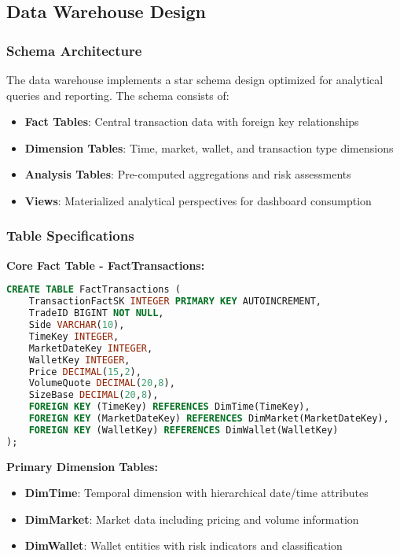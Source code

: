 \documentclass[12pt,a4paper]{article}
\begin{document}
\subsection{Data Warehouse Design}

\subsubsection{Schema Architecture}
The data warehouse implements a star schema design optimized for analytical queries and reporting. The schema consists of:

\begin{itemize}
    \item \textbf{Fact Tables}: Central transaction data with foreign key relationships
    \item \textbf{Dimension Tables}: Time, market, wallet, and transaction type dimensions
    \item \textbf{Analysis Tables}: Pre-computed aggregations and risk assessments
    \item \textbf{Views}: Materialized analytical perspectives for dashboard consumption
\end{itemize}

\subsubsection{Table Specifications}

\textbf{Core Fact Table - FactTransactions:}
\begin{lstlisting}[language=SQL]
CREATE TABLE FactTransactions (
    TransactionFactSK INTEGER PRIMARY KEY AUTOINCREMENT,
    TradeID BIGINT NOT NULL,
    Side VARCHAR(10),
    TimeKey INTEGER,
    MarketDateKey INTEGER,
    WalletKey INTEGER,
    Price DECIMAL(15,2),
    VolumeQuote DECIMAL(20,8),
    SizeBase DECIMAL(20,8),
    FOREIGN KEY (TimeKey) REFERENCES DimTime(TimeKey),
    FOREIGN KEY (MarketDateKey) REFERENCES DimMarket(MarketDateKey),
    FOREIGN KEY (WalletKey) REFERENCES DimWallet(WalletKey)
);
\end{lstlisting}

\textbf{Primary Dimension Tables:}
\begin{itemize}
    \item \textbf{DimTime}: Temporal dimension with hierarchical date/time attributes
    \item \textbf{DimMarket}: Market data including pricing and volume information
    \item \textbf{DimWallet}: Wallet entities with risk indicators and classification
\end{itemize}
\end{document}
